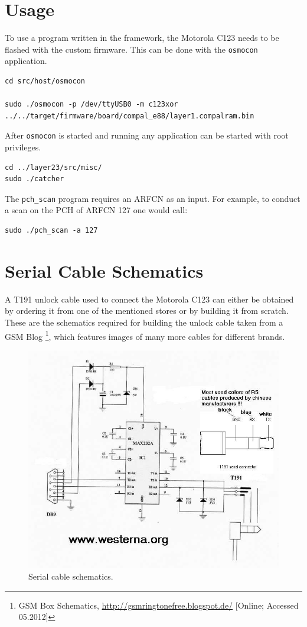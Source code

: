 \section{Usage}
\label{sec:osmo_usage}
To use a program written in the framework, the Motorola C123 needs to be flashed with the custom firmware.
This can be done with the \texttt{osmocon} application. 
\begin{verbatim}
cd src/host/osmocon

sudo ./osmocon -p /dev/ttyUSB0 -m c123xor
../../target/firmware/board/compal_e88/layer1.compalram.bin
\end{verbatim}
After \texttt{osmocon} is started and running any application can be started with root privileges.
\begin{verbatim}
cd ../layer23/src/misc/
sudo ./catcher
\end{verbatim}
The \texttt{pch\_scan} program requires an ARFCN as an input.
For example, to conduct a scan on the PCH of ARFCN 127 one would call:
\begin{verbatim}
sudo ./pch_scan -a 127
\end{verbatim}
\newpage

\section{Serial Cable Schematics}
\label{sec:osmo_serial_schematics}
A T191 unlock cable used to connect the Motorola C123 can either be obtained by ordering it from one of the mentioned stores or by building it from scratch.
These are the schematics required for building the unlock cable taken from a GSM Blog \footnote{GSM Box Schematics, \url{http://gsmringtonefree.blogspot.de/} [Online; Accessed 05.2012]}, which features images of many more cables for different brands.
\vfill
\begin{figure}[h!]
\includegraphics[width=.9\textwidth]{../Images/t191cable}
\caption{Serial cable schematics.}
\end{figure}
\vfill
